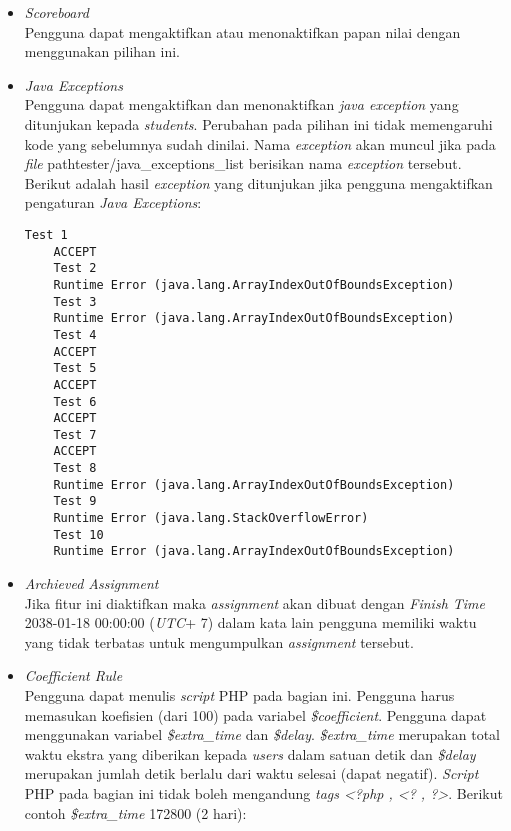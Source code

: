 \begin{itemize}
	\item \textit{Scoreboard} \\
	Pengguna dapat mengaktifkan atau menonaktifkan papan nilai dengan menggunakan pilihan ini.
	
	\item \textit{Java Exceptions} \\
	Pengguna dapat mengaktifkan dan menonaktifkan \textit{java exception} yang ditunjukan kepada \textit{students}. Perubahan pada pilihan ini tidak memengaruhi kode yang sebelumnya sudah dinilai. Nama \textit{exception} akan muncul jika pada \textit{file} path{tester/java\_exceptions\_list} berisikan nama \textit{exception} tersebut. Berikut adalah hasil \textit{exception} yang ditunjukan jika pengguna mengaktifkan pengaturan \textit{Java Exceptions}: \\
	
	\begin{lstlisting}[basicstyle=\ttfamily, frame=single,
	columns=fullflexible, keepspaces=true, breaklines=true, label=ls:6]
	Test 1
	ACCEPT
	Test 2
	Runtime Error (java.lang.ArrayIndexOutOfBoundsException)
	Test 3
	Runtime Error (java.lang.ArrayIndexOutOfBoundsException)
	Test 4
	ACCEPT
	Test 5
	ACCEPT
	Test 6
	ACCEPT
	Test 7
	ACCEPT
	Test 8
	Runtime Error (java.lang.ArrayIndexOutOfBoundsException)
	Test 9
	Runtime Error (java.lang.StackOverflowError)
	Test 10
	Runtime Error (java.lang.ArrayIndexOutOfBoundsException)
	\end{lstlisting}
	
	\item \textit{Archieved Assignment} \\
	Jika fitur ini diaktifkan maka \textit{assignment} akan dibuat dengan \textit{Finish Time} 2038-01-18 00:00:00 (\textit{UTC}+ 7) dalam kata lain pengguna memiliki waktu yang tidak terbatas untuk mengumpulkan \textit{assignment} tersebut.
	
	\item \textit{Coefficient Rule} \\
	Pengguna dapat menulis \textit{script} PHP pada bagian ini. Pengguna harus memasukan koefisien (dari 100) pada variabel \textit{\$coefficient}. Pengguna dapat menggunakan variabel \textit{\$extra\_time} dan \textit{\$delay}. \textit{\$extra\_time} merupakan total waktu ekstra yang diberikan kepada \textit{users} dalam satuan detik dan \textit{\$delay} merupakan jumlah detik berlalu dari waktu selesai (dapat negatif). \textit{Script} PHP pada bagian ini tidak boleh mengandung \textit{tags <?php , <? , ?>}. Berikut contoh \textit{\$extra\_time} 172800 (2 hari):
	

\end{itemize}
